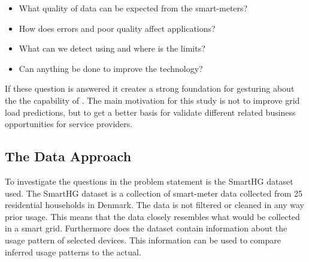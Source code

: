 \begin{itemize}
\item	What quality of data can be expected from the smart-meters?\\
	
\item	How does errors and poor quality affect  applications?\\
	
\item	What can we detect using   and where is the limits? \\
	
\item	Can anything be done to improve the  technology?
\end{itemize}
If these question is answered it creates a strong foundation for gesturing about the the capability of . The main motivation for this study is not to improve grid load predictions, but to get a better basis for validate different  related business opportunities for service providers. 

\subsection{The Data Approach}
To investigate the questions in the problem statement is the SmartHG dataset used. The SmartHG dataset is a collection of smart-meter data collected from 25 residential households in Denmark. The data is not filtered or cleaned in any way prior usage. This means that the data closely resembles what would be collected in a smart grid. Furthermore does the dataset contain information about the usage pattern of selected devices. This information can be used to compare inferred usage patterns to the actual. 
